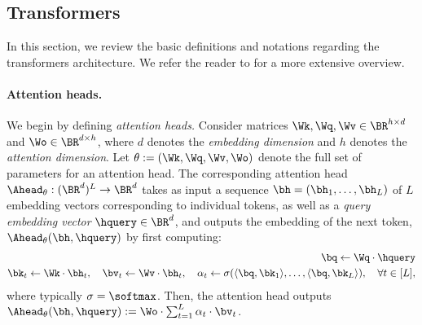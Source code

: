 \documentclass{article}
\newcommand{\icml}[1]{\iftoggle{icml}{#1}{}}
\begin{document}
\icml{
\subsection{Additional context on distributional assumptions}
\label{sec:basic-setup-appendix}
The following proposition rules out length \generalization in the absence of distributional assumptions. 
\begin{proposition}
  \label{prop:noasm-nolg}
Fix any $L, \bar L \in \BN$ with $L < \bar L$, and a hypothesis class $\MH \subset \MY^{\MV^\st}$. Let $\MP_1, \ldots, \MP_{L}$ be $\MH$-realizable distributions, realized by $h^\st$. Suppose that $\ep > 0$ and $\hat h$ defined in \cref{eq:define-hath} satisfies $\sup_{\bX \in \MV^{\bar L}} \Loss(h^\st(\bX), \hat h(\bX)) > \ep$. Then there is an ensemble $\MP$ extending $\MP_1, \ldots, \MP_L$ so that $\MH$ does not have $(L, \bar L, \ep)$-length \generalization with respect to $\MP$. 
\end{proposition}

Below, we give a simple example of a distribution ensemble having $k$-sparse planted correlations (per \cref{def:sparse-planted}).


}
\subsection{Transformers}
\label{sec:transformers-prelim}
In this section, we review the basic definitions and notations regarding the transformers architecture. We refer the reader to \citet{phuong_formal_2022} for a more extensive overview. 

\paragraph{Attention heads.} We begin by defining \emph{attention heads.} Consider matrices $\Wk, \Wq, \Wv \in \BR^{h \times d}$ and $\Wo \in \BR^{d \times h}$, where $d$ denotes the \emph{embedding dimension} and $h$ denotes the \emph{attention dimension}.  Let $\theta := (\Wk, \Wq, \Wv, \Wo)$ denote the full set of parameters for an attention head. The corresponding attention head $\Ahead_\theta : (\BR^d)^{L} \to \BR^d$ takes as input a sequence $\bh = (\bh_1, \ldots, \bh_L)$ of $L$ embedding vectors corresponding to individual tokens, as well as a \emph{query embedding vector} $\hquery \in \BR^d$, and outputs the embedding of the next token, $\Ahead_\theta(\bh, \hquery)$ by first computing:
\begin{align}
  \bq \gets \Wq \cdot \hquery \nonumber\\
  \bk_t \gets \Wk \cdot \bh_t, \quad \bv_t \gets \Wv \cdot \bh_t, \quad \alpha_t \gets \sigma(\langle \bq, \bk_1 \rangle, \ldots, \langle \bq, \bk_L \rangle), \quad \forall t \in [L],\nonumber
\end{align}
where typically $\sigma = \softmax$. %
Then, the attention head outputs $\Ahead_\theta(\bh, \hquery) := \Wo \cdot \sum_{t=1}^L \alpha_t \cdot \bv_t$.
\end{document}
